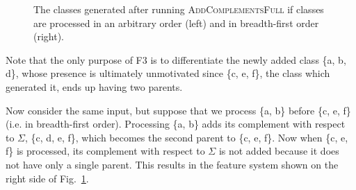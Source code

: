 \documentclass[11pt, oneside]{article}   	%
\begin{document}
\begin{figure}[h]
	\centering
	\qquad
	\caption{The classes generated after running \textsc{AddComplementsFull} if classes are processed in an arbitrary order (left) and in breadth-first order (right).}
	\label{fig:bfsfeats}
\end{figure}


Note that the only purpose of F3 is to differentiate the newly added class \{a, b, d\}, whose presence is ultimately unmotivated since \{c, e, f\}, the class which generated it, ends up having two parents.

Now consider the same input, but suppose that we process \{a, b\} before \{c, e, f\} (i.e. in breadth-first order). Processing \{a, b\} adds its complement with respect to $\Sigma$, \{c, d, e, f\}, which becomes the second parent to \{c, e, f\}. Now when \{c, e, f\} is processed, its complement with respect to $\Sigma$ is not added because it does not have only a single parent. This results in the feature system shown on the right side of Fig.~\ref{fig:bfsfeats}.
\end{document}
